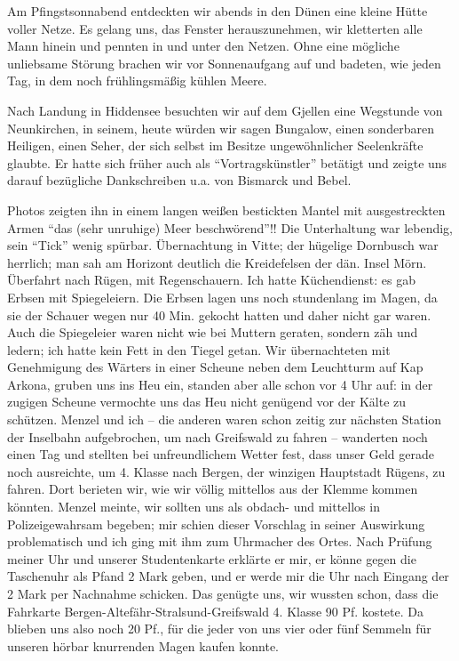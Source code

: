 \documentclass[a5paper,pagesize,10pt,twoside=true]{scrbook}
\renewcommand{\marginpar}[2][]{}
\begin{document}
Am Pfingstsonnabend entdeckten wir abends in den Dünen eine kleine Hütte voller Netze. Es gelang uns, das Fenster herauszunehmen, wir kletterten alle Mann hinein und pennten in und unter den Netzen. Ohne eine mögliche unliebsame Störung brachen wir vor Sonnenaufgang auf und badeten, wie jeden Tag, in dem noch frühlingsmäßig kühlen Meere.

Nach Landung in Hiddensee besuchten wir auf dem Gjellen eine Wegstunde von Neunkirchen, in seinem, heute würden wir sagen Bungalow, einen sonderbaren Heiligen, einen Seher, der sich selbst im Besitze ungewöhnlicher Seelenkräfte glaubte. Er hatte sich früher auch als \enquote{Vortragskünstler} betätigt und zeigte uns darauf bezügliche Dankschreiben u.a. von Bismarck und Bebel.

\marginpar{96}
Photos zeigten ihn in einem langen weißen bestickten Mantel mit ausgestreckten Armen \enquote{das (sehr unruhige) Meer beschwörend}!! Die Unterhaltung war lebendig, sein \enquote{Tick} wenig spürbar. Übernachtung in Vitte; der hügelige Dornbusch war herrlich; man sah am Horizont deutlich die Kreidefelsen der dän. Insel Mörn. Überfahrt nach Rügen, mit Regenschauern. Ich hatte Küchendienst: es gab Erbsen mit Spiegeleiern. Die Erbsen lagen uns noch stundenlang im Magen, da sie der Schauer wegen nur 40 Min. gekocht hatten und daher nicht gar waren. Auch die Spiegeleier waren nicht wie bei Muttern geraten, sondern zäh und ledern; ich hatte kein Fett in den Tiegel getan. Wir übernachteten mit Genehmigung des Wärters in einer Scheune neben dem Leuchtturm auf Kap Arkona, gruben uns ins Heu ein, standen aber alle schon vor 4 Uhr auf: in der zugigen Scheune vermochte uns das Heu nicht genügend vor der Kälte zu schützen. Menzel und ich -- die anderen waren schon zeitig zur nächsten Station der Inselbahn aufgebrochen, um nach Greifswald zu fahren -- wanderten noch einen Tag und stellten bei unfreundlichem Wetter fest, dass unser Geld gerade noch ausreichte, um 4. Klasse nach Bergen, der winzigen Hauptstadt Rügens, zu fahren. Dort berieten wir, wie wir völlig mittellos aus der Klemme kommen könnten. Menzel meinte, wir sollten uns als obdach- und mittellos in Polizeigewahrsam begeben; mir schien dieser Vorschlag in seiner Auswirkung problematisch und ich ging mit ihm zum Uhrmacher des Ortes. Nach Prüfung meiner Uhr und unserer Studentenkarte erklärte er mir, er könne gegen die Taschenuhr als Pfand 2 Mark geben, und er werde mir die Uhr nach Eingang der 2 Mark per Nachnahme schicken. Das genügte uns, wir wussten schon, dass die Fahrkarte Bergen-Altefähr-Stralsund-Greifswald 4. Klasse 90 Pf. kostete. Da blieben uns also noch 20 Pf., für die jeder von uns vier oder fünf Semmeln für unseren hörbar knurrenden Magen kaufen konnte.
\end{document}
